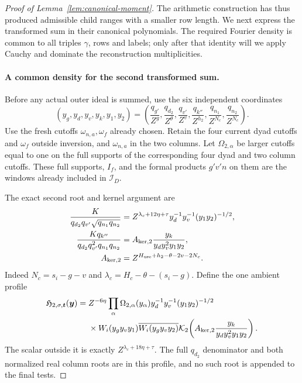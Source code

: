 \documentclass[11pt,a4paper]{article}
\numberwithin{equation}{section}
\numberwithin{figure}{section}
\theoremstyle{definition}
\theoremstyle{remark}
\begin{document}
\begin{proof}[Proof of Lemma~\ref{lem:canonical-moment}]
The arithmetic construction has thus produced admissible child ranges
with a smaller row length. We next express the transformed sum in their
canonical polynomials. The required Fourier density is common to all
triples \(\gamma\), rows and labels; only after that identity will we
apply Cauchy and dominate the reconstruction multiplicities.

\paragraph{A common density for the second transformed sum.}
Before any actual outer ideal is summed, use the six independent coordinates
\[
 (y_g,y_d,y_v,y_k,y_1,y_2)
 =\left(\frac{q_{g'}}{Z^g},\frac{q_{d_2}}{Z^\theta},
 \frac{q_{v'}}{Z^v},\frac{q_{k''}}{Z^{h_2}},
 \frac{q_{n_1}}{Z^{N_c}},\frac{q_{n_2}}{Z^{N_c}}\right).
\]
Use the fresh cutoffs \(\omega_{n,a},\omega_f\) already chosen.
Retain the four current dyad cutoffs
and \(\omega_f\) outside inversion, and \(\omega_{n,a}\) in the two
columns.  Let \(\Omega_{2,\alpha}\) be larger cutoffs equal to one on
the full supports of the corresponding four dyad and two column
cutoffs.  These full supports, \(I_f\), and the formal products
\(g'v'n\) on them are the windows already included in \(\mathcal I_D\).

The exact second root and kernel argument are
\begin{equation}\label{eq:inverse-second-root-kernel}
 \begin{split}
 \frac{K}{q_{d_2}q_{v'}\sqrt{q_{n_1}q_{n_2}}}
 &=Z^{\lambda_c+12\eta+\tau}y_d^{-1}y_v^{-1}(y_1y_2)^{-1/2},\\
 \frac{Kq_{k''}}{q_{d_2}q_{v'}^2q_{n_1}q_{n_2}}
 &=A_{{\rm ker},2}\frac{y_k}{y_dy_v^2y_1y_2},\\
 A_{{\rm ker},2}&=Z^{H_{\rm use}+h_2-\theta-2v-2N_c}.
 \end{split}
\end{equation}
Indeed \(N_c=s_i-g-v\) and
\(\lambda_c=H_c-\theta-(s_i-g)\).  Define the one ambient profile
\begin{equation}\label{eq:inverse-second-profile}
 \begin{split}
 \mathfrak H_{2,\sigma,\boldsymbol t}(\boldsymbol y)={}&Z^{-6\eta}
 \prod_\alpha\Omega_{2,\alpha}(y_\alpha)
 y_d^{-1}y_v^{-1}(y_1y_2)^{-1/2}\\
 &\times W_i(y_gy_vy_1)\overline{W_i(y_gy_vy_2)}
 \mathcal K_2\!\left(A_{{\rm ker},2}\frac{y_k}{y_dy_v^2y_1y_2}\right).
 \end{split}
\end{equation}
The scalar outside it is exactly \(Z^{\lambda_c+18\eta+\tau}\).
The full \(q_{d_2}\) denominator and both normalized real column roots
are in this profile, and no such root is appended to the final tests.


\end{proof}
\end{document}
